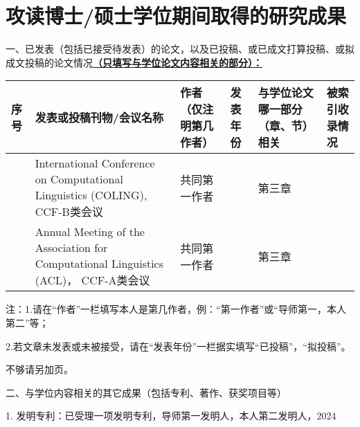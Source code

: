 \chapter{攻读博士/硕士学位期间取得的研究成果} %
\pubfont %
一、已发表（包括已接受待发表）的论文，以及已投稿、或已成文打算投稿、或拟成文投稿的论文情况\underline{\textbf{（只填写与学位论文内容相关的部分）：}}
\begin{table}
	\centering{}%
	\pubfont 
	\begin{longtable}{|>{\centering}m{0.5cm}|m{4.2cm}|>{\centering}m{2.3cm}|>{\centering}m{1.5cm}|>{\centering}m{2cm}|>{\centering}m{1.5cm}|}
		\hline 
		\textbf{序号} & \textbf{发表或投稿刊物/会议名称} & \textbf{作者（仅注明第几作者）} & \textbf{发表年份} & \textbf{与学位论文哪一部分（章、节）相关} &\textbf{被索引收录情况}\tabularnewline
		\hline 
		1 & International Conference on Computational Linguistics (COLING), CCF-B类会议 & 共同第一作者 & 2024 & 第三章 & \tabularnewline
		\hline 
		2 & Annual Meeting of the Association for Computational Linguistics (ACL)， CCF-A类会议 & 共同第一作者 & 2024 & 第三章 & \tabularnewline
		\hline 
	\end{longtable}
\end{table}

注：1.请在“作者”一栏填写本人是第几作者，例：“第一作者”或“导师第一，本人第二”等；

   2.若文章未发表或未被接受，请在“发表年份”一栏据实填写“已投稿”，“拟投稿”。

   不够请另加页。
\newline

二、与学位内容相关的其它成果（包括专利、著作、获奖项目等）

1. 发明专利：已受理一项发明专利，导师第一发明人，本人第二发明人，2024




\normalsize %